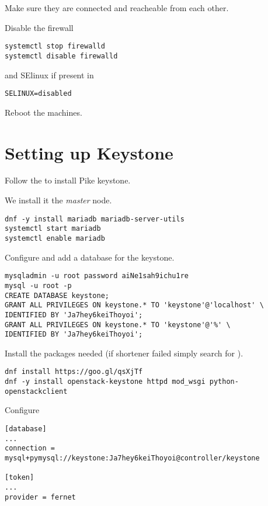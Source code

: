 Make sure they are connected and reacheable from each other.

Disable the firewall

\begin{lstlisting}
systemctl stop firewalld
systemctl disable firewalld
\end{lstlisting}

and SElinux if present in 

\begin{lstlisting}
SELINUX=disabled
\end{lstlisting}

Reboot the machines.

\section{Setting up Keystone}
\label{sec:setup-keystone}

Follow the
to install 
{Pike} keystone.

We install it the \emph{master} node.

\begin{lstlisting}
dnf -y install mariadb mariadb-server-utils
systemctl start mariadb
systemctl enable mariadb
\end{lstlisting}

Configure  and add a database for the keystone.

\begin{lstlisting}
mysqladmin -u root password aiNe1sah9ichu1re
mysql -u root -p
CREATE DATABASE keystone;
GRANT ALL PRIVILEGES ON keystone.* TO 'keystone'@'localhost' \
IDENTIFIED BY 'Ja7hey6keiThoyoi';
GRANT ALL PRIVILEGES ON keystone.* TO 'keystone'@'%' \
IDENTIFIED BY 'Ja7hey6keiThoyoi';
\end{lstlisting}

Install the packages needed (if shortener failed simply search for
\code{rdo-release-pike.rpm}).

\begin{lstlisting}
dnf install https://goo.gl/qsXjTf
dnf -y install openstack-keystone httpd mod_wsgi python-openstackclient
\end{lstlisting}

Configure 

\begin{lstlisting}
[database]
...
connection = mysql+pymysql://keystone:Ja7hey6keiThoyoi@controller/keystone

[token]
...
provider = fernet
\end{lstlisting}

